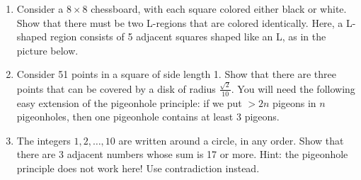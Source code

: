 \documentclass[12pt]{article}
\newcommand{\drawsquare}[2]{\filldraw[black!40!white] ({#1},{#2}) -- ({#1+1},{#2}) -- ({#1+1},{#2+1}) -- ({#1},{#2+1}) -- ({#1},{#2});}
\newcommand{\drawL}[2]{\draw[cyan,line width=1.5mm] ({#1},{#2}) -- ({#1+3},{#2}) -- ({#1+3},{#2+1}) -- ({#1+1},{#2+1}) -- ({#1+1},{#2+3}) -- ({#1},{#2+3}) -- ({#1},{#2});}
\begin{document}
\begin{enumerate}
\begin{enumerate}

\item Consider a \( 8 \times 8 \) chessboard, with each square colored either black or white. Show that there must be two L-regions that are colored identically. Here, a L-shaped region consists of 5 adjacent squares shaped like an L, as in the picture below. \newline
\begin{center}
\end{center}


\item Consider 51 points in a square of side length 1. Show that there are three points that can be covered by a disk of radius \( \frac{\sqrt{2}}{10} \). You will need the following easy extension of the pigeonhole principle: if we put \( > 2n \) pigeons in \( n \) pigeonholes, then one pigeonhole contains at least 3 pigeons. \newline


\item The integers \( 1, 2, \dots, 10 \) are written around a circle, in any order. Show that there are 3 adjacent numbers whose sum is 17 or more. Hint: the pigeonhole principle does not work here! Use contradiction instead. \newline

\end{enumerate}



\end{enumerate}
\newpage %
\end{document}
